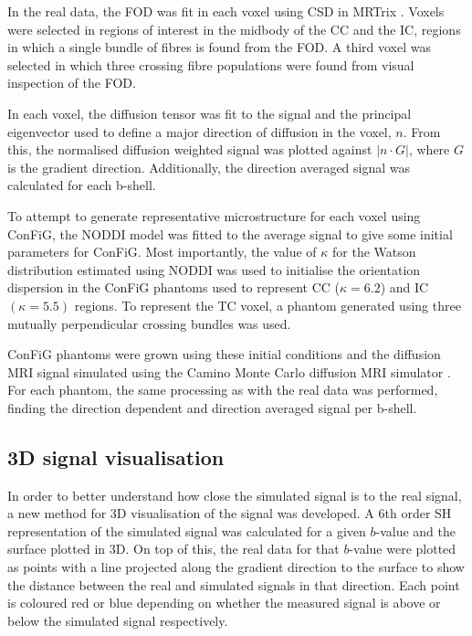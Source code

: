 In the real data, the \ac{FOD} was fit in each voxel using \ac{CSD} in MRTrix \cite{Tournier2019,Tournier2007}. Voxels were selected in regions of interest in the midbody of the \ac{CC} and the \ac{IC}, regions in which a single bundle of fibres is found from the FOD. A third voxel was selected in which three crossing fibre populations were found from visual inspection of the FOD.


In each voxel, the diffusion tensor was fit to the signal and the principal eigenvector used to define a major direction of diffusion in the voxel, $n$. From this, the normalised diffusion weighted signal was plotted against $|n\cdot G|$, where $G$ is the gradient direction. Additionally, the direction averaged signal was calculated for each b-shell.

To attempt to generate representative microstructure for each voxel using \ac{ConFiG}, the \ac{NODDI} model \cite{Zhang2012} was fitted to the average signal to give some initial parameters for \ac{ConFiG}. Most importantly, the value of $\kappa$ for the Watson distribution \cite{Mardia2008} estimated using \ac{NODDI} was used to initialise the orientation dispersion in the \ac{ConFiG} phantoms used to represent \ac{CC} ($\kappa=6.2$) and \ac{IC} $(\kappa=5.5)$ regions. To represent the \ac{TC} voxel, a phantom generated using three mutually perpendicular crossing bundles was used.

ConFiG phantoms were grown using these initial conditions and the diffusion \ac{MRI} signal simulated using the Camino Monte Carlo diffusion \ac{MRI} simulator \cite{Hall2009}. For each phantom, the same processing as with the real data was performed, finding the direction dependent and direction averaged signal per b-shell.

\subsection{3D signal visualisation}
\label{sec:config_3d_signal_vis}
In order to better understand how close the simulated signal is to the real signal, a new method for 3D visualisation of the signal was developed.
A 6th order \ac{SH} representation of the simulated signal was calculated for a given $b$-value and the surface plotted in 3D. On top of this, the real data for that $b$-value were plotted as points with a line projected along the gradient direction to the surface to show the distance between the real and simulated signals in that direction.
Each point is coloured red or blue depending on whether the measured signal is above or below the simulated signal respectively.

